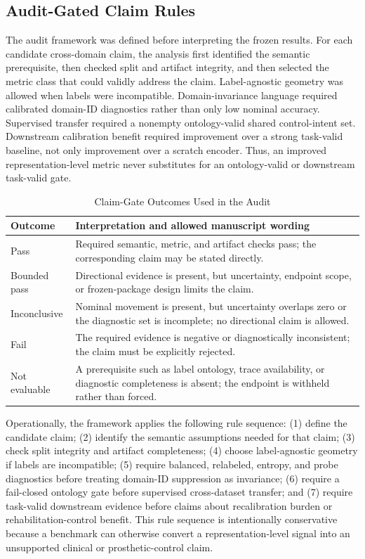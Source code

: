 \documentclass[journal]{IEEEtran}
\begin{document}
\subsection{Audit-Gated Claim Rules}
The audit framework was defined before interpreting the frozen results. For each candidate cross-domain claim, the analysis first identified the semantic prerequisite, then checked split and artifact integrity, and then selected the metric class that could validly address the claim. Label-agnostic geometry was allowed when labels were incompatible. Domain-invariance language required calibrated domain-ID diagnostics rather than only low nominal accuracy. Supervised transfer required a nonempty ontology-valid shared control-intent set. Downstream calibration benefit required improvement over a strong task-valid baseline, not only improvement over a scratch encoder. Thus, an improved representation-level metric never substitutes for an ontology-valid or downstream task-valid gate.

\begin{table}[t]
\caption{Claim-Gate Outcomes Used in the Audit}
\label{tab:gateoutcomes}
\centering
\footnotesize
\begin{tabularx}{\columnwidth}{@{}p{1.55cm}Y@{}}
\toprule
Outcome & Interpretation and allowed manuscript wording \\
\midrule
Pass & Required semantic, metric, and artifact checks pass; the corresponding claim may be stated directly. \\
Bounded pass & Directional evidence is present, but uncertainty, endpoint scope, or frozen-package design limits the claim. \\
Inconclusive & Nominal movement is present, but uncertainty overlaps zero or the diagnostic set is incomplete; no directional claim is allowed. \\
Fail & The required evidence is negative or diagnostically inconsistent; the claim must be explicitly rejected. \\
Not evaluable & A prerequisite such as label ontology, trace availability, or diagnostic completeness is absent; the endpoint is withheld rather than forced. \\
\bottomrule
\end{tabularx}
\end{table}

Operationally, the framework applies the following rule sequence: (1) define the candidate claim; (2) identify the semantic assumptions needed for that claim; (3) check split integrity and artifact completeness; (4) choose label-agnostic geometry if labels are incompatible; (5) require balanced, relabeled, entropy, and probe diagnostics before treating domain-ID suppression as invariance; (6) require a fail-closed ontology gate before supervised cross-dataset transfer; and (7) require task-valid downstream evidence before claims about recalibration burden or rehabilitation-control benefit. This rule sequence is intentionally conservative because a benchmark can otherwise convert a representation-level signal into an unsupported clinical or prosthetic-control claim.
\end{document}
